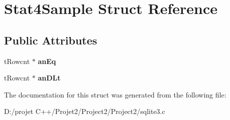 \hypertarget{struct_stat4_sample}{}\section{Stat4\+Sample Struct Reference}
\label{struct_stat4_sample}
\subsection*{Public Attributes}
\begin{DoxyCompactItemize}
\item 
\mbox{\label{struct_stat4_sample_a8dd17556ec12614fbf4b88ab0bc82749}} 
t\+Rowcnt $\ast$ {\bfseries an\+Eq}
\item 
\mbox{\label{struct_stat4_sample_a25519389bab21052bf80af8500388a37}} 
t\+Rowcnt $\ast$ {\bfseries an\+D\+Lt}
\end{DoxyCompactItemize}


The documentation for this struct was generated from the following file\+:\begin{DoxyCompactItemize}
\item 
D\+:/projet C++/\+Projet2/\+Project2/\+Project2/sqlite3.\+c\end{DoxyCompactItemize}
